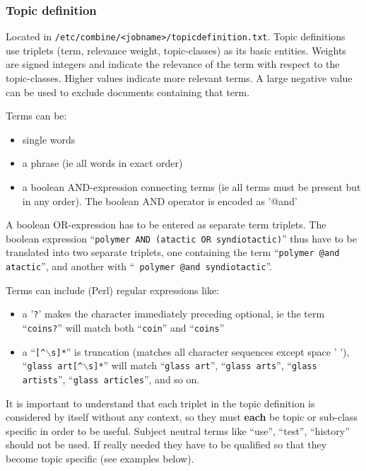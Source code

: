 \subsubsection{Topic definition}
\label{topicdef}
Located in {\tt /etc/combine/<jobname>/topicdefinition.txt}.
Topic definitions use triplets (term,
relevance weight, topic-classes) as its basic entities. Weights
are signed integers and indicate the relevance of the term with respect to
the topic-classes. Higher values indicate more relevant terms. A large
negative value can be used to exclude documents containing that term.

Terms can be:
\begin{itemize}
  \item single words
  \item a phrase (ie all words in exact order)
  \item a boolean AND-expression connecting terms (ie all terms must
      be present but in any order). The boolean AND operator is encoded as '@and'
\end{itemize}
A boolean OR-expression has to be entered as separate term triplets.
The boolean expression ``{\tt polymer AND (atactic OR syndiotactic)}''
thus have to be translated into two separate triplets, one containing
the term ``{\tt polymer @and atactic}'', and another with ``{\tt
polymer @and syndiotactic}''.

Terms can include (Perl) regular expressions like:
\begin{itemize}
  \item a '{\tt ?}' makes the character immediately preceding optional, ie
      the term ``{\tt coins?}'' will match both ``{\tt coin}'' and ``{\tt coins}''
  \item a ``{\tt [\^{ }$\backslash$s]*}'' is truncation (matches all
      character sequences except space ' '),\\
      ``{\tt glass art[\^{ }$\backslash$s]*}'' will match 
      ``{\tt glass art}'', ``{\tt glass arts}'', ``{\tt glass
      artists}'', ``{\tt glass articles}'', and so on.
\end{itemize}

It is important to understand that each triplet in the topic definition
 is considered by itself
without any context, so they must {\bf each} be topic or sub-class specific in order to
be useful. Subject neutral terms like ``use'', ``test'', ``history'' should
not be used.
If really needed they have to be qualified so that they become topic
specific (see examples below).

